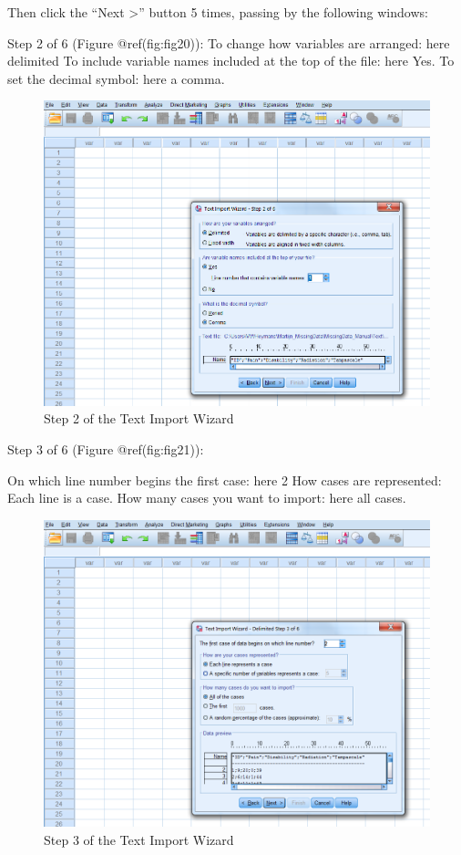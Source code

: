 \documentclass[
]{book}
\begin{document}
Then click the ``Next \textgreater{}'' button 5 times, passing by the
following windows:

Step 2 of 6 (Figure @ref(fig:fig20)): To change how variables are
arranged: here delimited To include variable names included at the top
of the file: here Yes. To set the decimal symbol: here a comma.

\begin{figure}

{\centering \includegraphics[width=0.95\linewidth]{images/fig1.20} 

}

\caption{Step 2 of the Text Import Wizard}\label{fig:fig20}
\end{figure}

Step 3 of 6 (Figure @ref(fig:fig21)):

On which line number begins the first case: here 2 How cases are
represented: Each line is a case. How many cases you want to import:
here all cases.

\begin{figure}

{\centering \includegraphics[width=0.95\linewidth]{images/fig1.21} 

}

\caption{Step 3 of the Text Import Wizard}\label{fig:fig21}
\end{figure}
\end{document}
